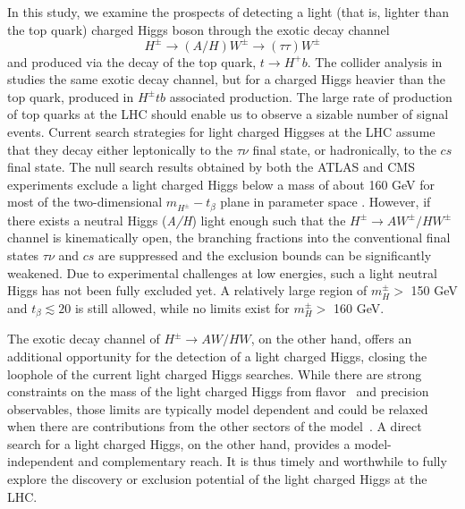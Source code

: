 In this study, we examine the prospects of detecting a light (that is, lighter than the top quark) charged Higgs boson through the exotic decay channel
\[H^\pm\rightarrow (A/H)W^\pm\rightarrow (\tau\tau) W^\pm\]
and produced via the decay of the top quark, $t\rightarrow H^+ b$.
The collider analysis in \cite{Coleppa:2014cca} studies the same exotic decay channel, but for a charged Higgs heavier than the top quark, produced in $H^\pm tb$ associated production.
The large rate of production of top quarks at the LHC should enable us to observe a sizable number of signal events. Current search strategies for light charged Higgses at the LHC assume that they decay either leptonically to the $\tau\nu$ final state, or hadronically, to the $cs$ final state. The null search results obtained by both the ATLAS and CMS experiments exclude a light charged Higgs below a mass of about 160 GeV for most of the two-dimensional $m_{H^\pm}-t_{\beta}$ plane in parameter space \cite{TheATLAScollaboration:2013wia,CMS:2014cdp}. However, if there exists a neutral Higgs (\emph{A/H}) light enough such that the $H^{\pm} \rightarrow AW^{\pm}/HW^{\pm}$ channel is kinematically open, the branching fractions into the conventional final states $\tau\nu$ and $cs$ are suppressed and the exclusion bounds can be significantly weakened. Due to experimental challenges at low energies, such a light neutral Higgs has not been fully excluded yet. A relatively large region of $m_H^\pm > $ 150 GeV and $t_\beta \lesssim 20$ is still allowed, while no limits exist for $m_H^\pm > $ 160 GeV.

The exotic decay channel of $H^\pm \to AW/HW$, on the other hand,  offers an additional opportunity for the detection of a light charged Higgs, closing the loophole of the current light charged Higgs searches.  While there are strong constraints on the mass of the light charged Higgs from flavor~\cite{Mahmoudi:2009zx,Coleppa:2013dya} and precision~\cite{Froggatt:1991qw,Froggatt:1992wt,Pomarol:1993mu,WahabElKaffas:2007xd,Haber:2010bw} observables, those limits are typically model dependent and could be relaxed when there are contributions from the other sectors of the model~\cite{Han:2013mga}. A direct search for a light charged Higgs, on the other hand,  provides a model-independent and complementary reach. It is thus timely and worthwhile to fully explore the discovery or exclusion potential of the light charged Higgs at the LHC.

